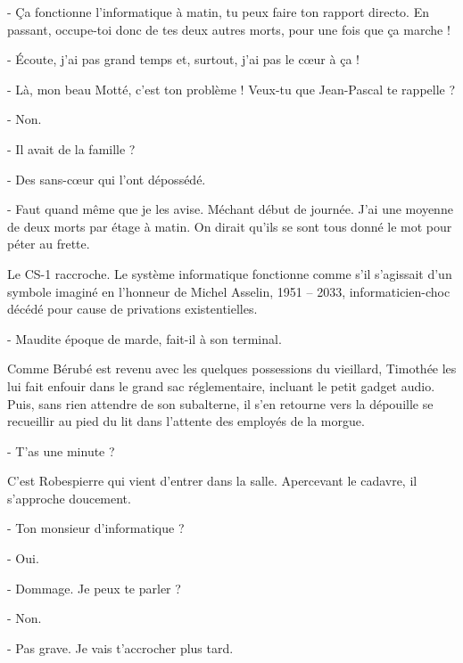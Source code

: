 - Ça fonctionne l’informatique à matin, tu peux faire ton rapport directo. En passant, occupe-toi donc de tes deux autres morts, pour une fois que ça marche !

- Écoute, j’ai pas grand temps et, surtout, j’ai pas le cœur à ça !

- Là, mon beau Motté, c’est ton problème ! Veux-tu que Jean-Pascal te rappelle ?

- Non.

- Il avait de la famille ?

- Des sans-cœur qui l’ont dépossédé.

- Faut quand même que je les avise. Méchant début de journée. J’ai une moyenne de deux morts par étage à matin. On dirait qu’ils se sont tous donné le mot pour péter au frette.

Le CS-1 raccroche. Le système informatique fonctionne comme s’il s’agissait d’un symbole imaginé en l’honneur de Michel Asselin, 1951 – 2033, informaticien-choc décédé pour cause de privations existentielles.

- Maudite époque de marde, fait-il à son terminal.

Comme Bérubé est revenu avec les quelques possessions du vieillard, Timothée les lui fait enfouir dans le grand sac réglementaire, incluant le petit gadget audio. Puis, sans rien attendre de son subalterne, il s’en retourne vers la dépouille se recueillir au pied du lit dans l’attente des employés de la morgue.

- T’as une minute ?

C’est Robespierre qui vient d’entrer dans la salle. Apercevant le cadavre, il s’approche doucement.

- Ton monsieur d’informatique ?

- Oui.

- Dommage. Je peux te parler ?

- Non.

- Pas grave. Je vais t’accrocher plus tard.


